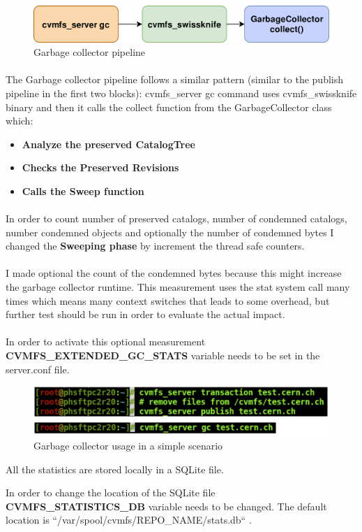 \begin{figure}[h]
\centering
\includegraphics[scale=0.17]{figures/gc_pipeline}
\caption{Garbage collector pipeline}
\end{figure}
\paragraph{}
The Garbage collector pipeline follows a similar pattern (similar to the publish pipeline in the first two blocks): cvmfs\_server gc command uses cvmfs\_swissknife binary and then it calls the collect function from the GarbageCollector class which:
\begin{itemize}
    \item \textbf{Analyze the preserved CatalogTree}
    \item \textbf{Checks the Preserved Revisions}
    \item \textbf{Calls the Sweep function}
\end{itemize}

\paragraph{}In order to count number of preserved catalogs, number of condemned catalogs, number condemned objects and optionally the number of condemned bytes I changed the \textbf{Sweeping phase} by increment the thread safe counters. 
\paragraph{}I made optional the count of the condemned bytes because this might increase the garbage collector runtime. This measurement uses the stat system call many times which means many context switches that leads to some overhead, but further test should be run in order to evaluate the actual impact.
\paragraph{} In order to activate this optional measurement \textbf{CVMFS\_EXTENDED\_GC\_STATS} variable needs to be set in the server.conf file.
\begin{figure}[h]
\centering
\includegraphics[scale=0.5]{figures/gc_workflow}
\caption{Garbage collector usage in a simple scenario}
\end{figure}

\par
All the statistics are stored locally in a SQLite file.
\par
In order to change the location of the SQLite file \textbf{CVMFS\_STATISTICS\_DB} variable needs to be changed. The default location is ``/var/spool/cvmfs/REPO\_NAME/stats.db`` .